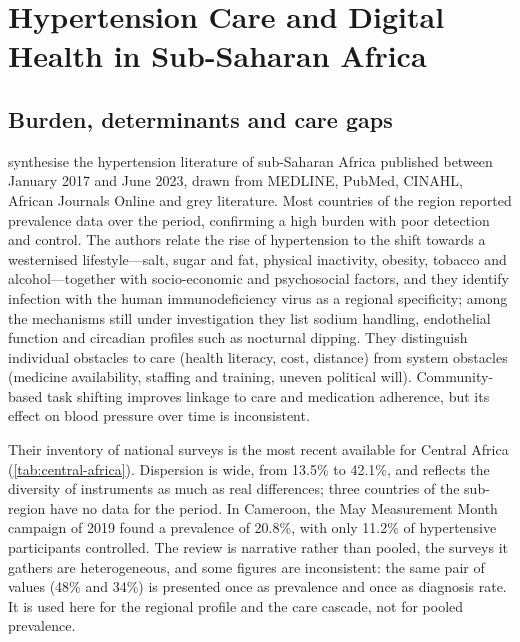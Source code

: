 \section{Hypertension Care and Digital Health in Sub-Saharan Africa}\label{sec:lr-regional}\label{sec:diagnosis}

\subsection{Burden, determinants and care gaps}

\Textcite{gafane2024} synthesise the hypertension literature of sub-Saharan Africa published between January 2017 and June 2023, drawn from MEDLINE, PubMed, CINAHL, African Journals Online and grey literature. Most countries of the region reported prevalence data over the period, confirming a high burden with poor detection and control. The authors relate the rise of hypertension to the shift towards a westernised lifestyle---salt, sugar and fat, physical inactivity, obesity, tobacco and alcohol---together with socio-economic and psychosocial factors, and they identify infection with the human immunodeficiency virus as a regional specificity; among the mechanisms still under investigation they list sodium handling, endothelial function and circadian profiles such as nocturnal dipping. They distinguish individual obstacles to care (health literacy, cost, distance) from system obstacles (medicine availability, staffing and training, uneven political will). Community-based task shifting improves linkage to care and medication adherence, but its effect on blood pressure over time is inconsistent.

Their inventory of national surveys is the most recent available for Central Africa (\cref{tab:central-africa}). Dispersion is wide, from 13.5\% to 42.1\%, and reflects the diversity of instruments as much as real differences; three countries of the sub-region have no data for the period. In Cameroon, the May Measurement Month campaign of 2019 found a prevalence of 20.8\%, with only 11.2\% of hypertensive participants controlled. The review is narrative rather than pooled, the surveys it gathers are heterogeneous, and some figures are inconsistent: the same pair of values (48\% and 34\%) is presented once as prevalence and once as diagnosis rate. It is used here for the regional profile and the care cascade, not for pooled prevalence.

